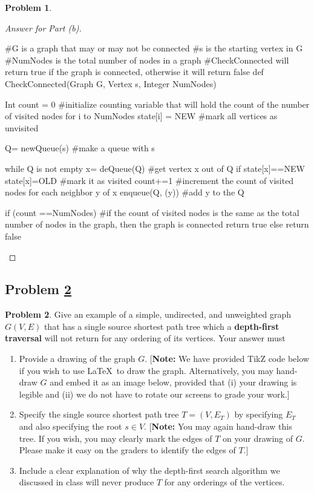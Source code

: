 \documentclass[11pt]{article}
\theoremstyle{definition}
\theoremstyle{definition}
\newtheorem{required}{Problem}
\theoremstyle{definition}
\begin{document}
\begin{required}
\begin{enumerate}[label=(\alph*)]
\begin{proof}[Answer for Part (b)]
\begin{python}

#G is a graph that may or may not be connected
#s is the starting vertex in G
#NumNodes is the total number of nodes in a graph
#CheckConnected will return true if the graph is connected, otherwise it will return false
def CheckConnected(Graph G, Vertex s, Integer NumNodes) {
	Int count = 0 	   #initialize counting variable that will hold the count of the number of visited nodes
	for i to NumNodes {
		state[i] = NEW 	#mark all vertices as unvisited
	}

	Q= newQueue(s) 	  #make a queue with s

	while Q is not empty {
		x= deQueue(Q) 	#get vertex x out of Q
		if state[x]==NEW {
			state[x]=OLD 	#mark it as visited
			count+=1	 	#increment the count of visited nodes 
			for each neighbor y of x {
				enqueue(Q, (y)) 	#add y to the Q
			}
		}
	}

	if (count ==NumNodes) { 	#if the count of visited nodes is the same as the total number of nodes in the graph, then the graph is connected
		return true
	}
	else {
		return false
	}
}
\end{python}
\end{proof}
\end{enumerate}
\end{required}






\newpage
\subsection{Problem \ref{DFS2}} 
\begin{required} \label{DFS2}
Give an example of a simple, undirected, and unweighted graph $G(V, E)$ that has a single source shortest path tree which a \textbf{depth-first traversal} will not return for any ordering of its vertices. 
    Your answer must
    \begin{enumerate}[label=(\alph*)]
    	\item Provide a drawing of the graph $G$. [\textbf{Note:} We have provided TikZ code below if you wish to use \LaTeX \ to draw the graph. Alternatively, you may hand-draw $G$ and embed it as an image below, provided that (i) your drawing is legible and (ii) we do not have to rotate our screens to grade your work.]
    	\item Specify the single source shortest path tree $T = (V,E_T)$ by specifying $E_T$ and also specifying the root $s \in V$. [\textbf{Note:} You may again hand-draw this tree. If you wish, you may clearly mark the edges of $T$ on your drawing of $G$. Please make it easy on the graders to identify the edges of $T$.] 
    	\item Include a clear explanation of why the depth-first search algorithm we discussed in class will never produce $T$ for any orderings of the vertices.
    \end{enumerate}

\end{required}
\end{document}

